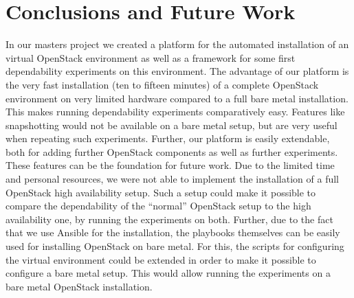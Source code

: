 \section[Conclusions and Future Work \texorpdfstring{{\textbf{\tiny \enspace (JE, SK, NK)}}}{}]{Conclusions and Future Work}
\label{conclusion}

In our masters project we created a platform for the automated installation of an virtual OpenStack environment as well as a framework for some first dependability experiments on this environment. The advantage of our platform is the very fast installation (ten to fifteen minutes) of a complete OpenStack environment on very limited hardware compared to a full bare metal installation. This makes running dependability experiments comparatively easy. Features like snapshotting would not be available on a bare metal setup, but are very useful when repeating such experiments. Further, our platform is easily extendable, both for adding further OpenStack components as well as further experiments.\\

These features can be the foundation for future work. Due to the limited time and personal resources, we were not able to implement the installation of a full OpenStack high availability setup. Such a setup could make it possible to compare the dependability of the ``normal'' OpenStack setup to the high availability one, by running the experiments on both. Further, due to the fact that we use Ansible for the installation, the playbooks themselves can be easily used for installing OpenStack on bare metal. For this, the scripts for configuring the virtual environment could be extended in order to make it possible to configure a bare metal setup. This would allow running the experiments on a bare metal OpenStack installation.